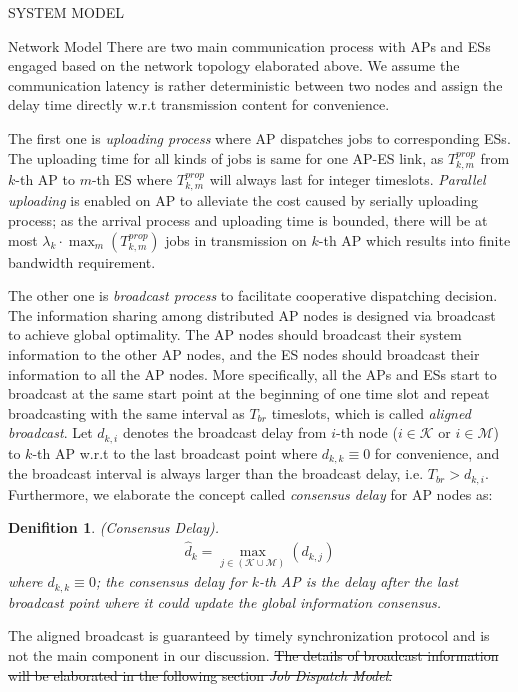 \documentclass[10pt, conference, letterpaper]{IEEEtran}
\newtheorem{definition}{Denifition}
\newcommand{\apSet}{\mathcal{K}}
\newcommand{\esSet}{\mathcal{M}}
\begin{document}
\begin{section}{SYSTEM MODEL}
\begin{subsection}{Network Model}
            There are two main communication process with APs and ESs engaged based on the network topology elaborated above. We assume the communication latency is rather deterministic between two nodes and assign the delay time directly w.r.t transmission content for convenience.

            The first one is \emph{uploading process} where AP dispatches jobs to corresponding ESs. The uploading time for all kinds of jobs is same for one AP-ES link, as $T^{prop}_{k,m}$ from $k$-th AP to $m$-th ES where $T^{prop}_{k,m}$ will always last for integer timeslots. \emph{Parallel uploading} is enabled on AP to alleviate the cost caused by serially uploading process; as the arrival process and uploading time is bounded, there will be at most $\lambda_k \cdot \max_m(T^{prop}_{k,m})$ jobs in transmission on $k$-th AP which results into finite bandwidth requirement.
            
            The other one is \emph{broadcast process} to facilitate cooperative dispatching decision.
            The information sharing among distributed AP nodes is designed via broadcast to achieve global optimality. The AP nodes should broadcast their system information to the other AP nodes, and the ES nodes should broadcast their information to all the AP nodes. More specifically, all the APs and ESs start to broadcast at the same start point at the beginning of one time slot and repeat broadcasting with the same interval as $T_{br}$ timeslots, which is called \emph{aligned broadcast}. Let $d_{k,i}$ denotes the broadcast delay from $i$-th node ($i\in\apSet$ or $i\in\esSet$) to $k$-th AP w.r.t to the last broadcast point where $d_{k,k} \equiv 0$ for convenience, and the broadcast interval is always larger than the broadcast delay, i.e. $T_{br} > d_{k,i}$.
            Furthermore, we elaborate the concept called \emph{consensus delay} for AP nodes as:
            \begin{definition}
                (Consensus Delay).
                \begin{align}
                    \hat{d}_k = \max_{j\in(\apSet\cup\esSet)}(d_{k,j})
                \end{align}
                where $d_{k,k} \equiv 0$; the consensus delay for $k$-th AP is the delay after the last broadcast point where it could update the global information consensus.
            \end{definition}
            The aligned broadcast is guaranteed by timely synchronization protocol and is not the main component in our discussion. \st{The details of  broadcast information will be elaborated in the following section \emph{Job Dispatch Model}.}
        \end{subsection}


\end{section}
\end{document}
